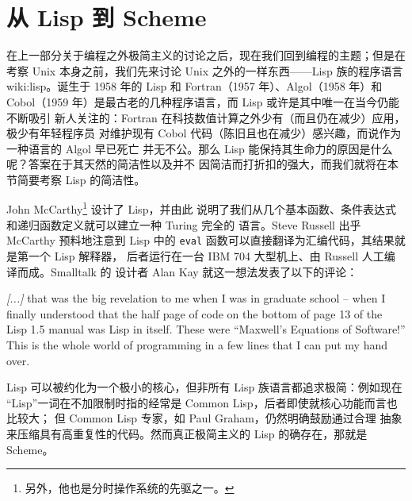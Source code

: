 \newpart
\section{从 Lisp 到 Scheme}\label{sec:lisp}

在上一部分关于编程之外极简主义的讨论之后，现在我们回到编程的主题；但是在考察
Unix 本身之前，我们先来讨论 Unix 之外的一样东西——Lisp 族的程序语言\cupercite%
{wiki:lisp}。诞生于 1958 年的 Lisp 和 Fortran（1957 年）、Algol（1958 年）和
Cobol（1959 年）是最古老的几种程序语言，而 Lisp 或许是其中唯一在当今仍能不断吸引
新人关注的：Fortran 在科技数值计算之外少有（而且仍在减少）应用，极少有年轻程序员
对维护现有 Cobol 代码（陈旧且也在减少）感兴趣，而说作为一种语言的 Algol 早已死亡
并无不公。那么 Lisp 能保持其生命力的原因是什么呢？答案在于其天然的简洁性以及并不
因简洁而打折扣的强大，而我们就将在本节简要考察 Lisp 的简洁性。

John McCarthy\footnote{另外，他也是分时操作系统的先驱之一。} 设计了 Lisp，并由此
说明了我们从几个基本函数、条件表达式和递归函数定义就可以建立一种 Turing 完全的
语言。Steve Russell 出乎 McCarthy 预料地注意到 Lisp
中的 \verb|eval| 函数可以直接翻译为汇编代码，其结果就是第一个 Lisp 解释器，
后者运行在一台 IBM 704 大型机上、由 Russell 人工编译而成。Smalltalk 的
设计者 Alan Kay 就这一想法发表了以下的评论：
\begin{quoting}
	\emph{[...]} that was the big revelation to me when I was in graduate
	school -- when I finally understood that the half page of code on the
	bottom of page 13 of the Lisp 1.5 manual was Lisp
	in itself.  These were ``Maxwell's Equations of Software!''  This is the
	whole world of programming in a few lines that I can put my hand over.
\end{quoting}
Lisp 可以被约化为一个极小的核心，但非所有 Lisp 族语言都追求极简：例如现在
“Lisp”一词在不加限制时指的经常是 Common Lisp，后者即使就核心功能而言也比较大；
但 Common Lisp 专家，如 Paul Graham，仍然明确鼓励通过合理
抽象来压缩具有高重复性的代码。然而真正极简主义的 Lisp 的确存在，那就是 Scheme。

